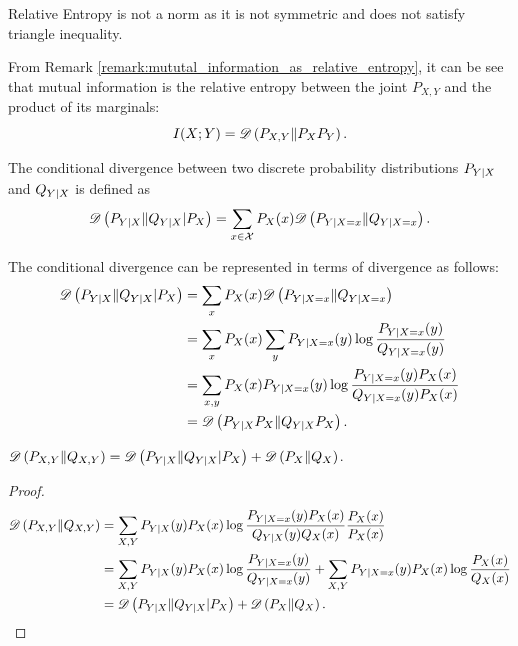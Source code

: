\documentclass[11pt,a4paper]{article}
\begin{document}
\begin{remark}
    Relative Entropy is not a norm as it is not symmetric and does not satisfy triangle inequality.
\end{remark}

\begin{remark}
    From Remark \ref{remark:mututal_information_as_relative_entropy}, it can be see that mutual information is the relative entropy between the joint $P_{X,Y}$ and the product of its marginals:
    \begin{equation*}
        I(X;Y) = \mathscr{D} \left(P_{X,Y}\|P_XP_Y\right).
    \end{equation*}
\end{remark}

\begin{definition}
    The conditional divergence between two discrete probability distributions $P_{Y|X}$ and $Q_{Y|X}$ is defined as
    \begin{equation*}
        \mathscr{D} \left(P_{Y|X}\|Q_{Y|X} | P_X\right) = \sum_{x\in\mathcal{X}} P_X(x) \mathscr{D} \left(P_{Y|X=x}\|Q_{Y|X=x}\right).
    \end{equation*}
\end{definition}

\begin{remark}
    The conditional divergence can be represented in terms of divergence as follows:
    \begin{align*}
        \mathscr{D} \left(P_{Y|X}\|Q_{Y|X} | P_X\right) &= \sum_{x}P_{X}(x) \mathscr{D} \left(P_{Y|X=x}\|Q_{Y|X=x}\right) \\
            & = \sum_{x}P_{X}(x) \sum_{y} P_{{Y|X} = x} (y) \log{\frac{P_{{Y|X}= x}(y)}{Q_{{Y|X}= x}(y)}} \\
            & = \sum_{x, y} P_{X}(x) P_{{Y|X} = x} (y) \log{\frac{P_{{Y|X}= x}(y) P_X(x)}{Q_{{Y|X}= x}(y) P_X(x)}} \\
            & = \mathscr{D} \left(P_{Y|X} P_X\|Q_{Y|X} P_X\right).
    \end{align*}
\end{remark}

\begin{theorem}
    $\mathscr{D} \left(P_{X,Y}\|Q_{X,Y}\right) = \mathscr{D} \left(P_{Y|X}\|Q_{Y|X} | P_X\right) + \mathscr{D} \left(P_X\|Q_X\right)$.
\end{theorem}

\begin{proof}
    \begin{align*}
        \mathscr{D} \left(P_{X,Y}\|Q_{X,Y}\right) &= \sum_{{X,Y}} P_{Y|X} (y) P_X(x) \log{\frac{P_{{Y|X}= x}(y) P_X(x)}{Q_{Y|X}(y) Q_X(x)} \frac{P_X(x)}{P_X(x)}} \\
            &= \sum_{{X,Y}} P_{Y|X} (y) P_X(x) \log{\frac{P_{{Y|X}= x}(y) }{Q_{{Y|X}=x}(y)}} + \sum_{{X,Y}} P_{{Y|X}=x} (y) P_X(x) \log{ \frac{P_X(x)}{Q_X(x)}} \\
            &= \mathscr{D} \left(P_{Y|X}\|Q_{Y|X} | P_X\right) + \mathscr{D} \left(P_X\|Q_X\right).
    \end{align*}
\end{proof}
    
\end{document}
